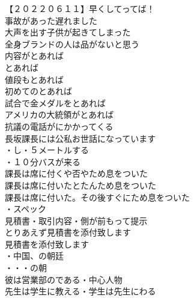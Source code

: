 \begin{multicols}{2}

【２０２２０６１１】早くしてってば！\\
事故があった遅れました\\
大声を出す子供が起きてしまった\\
全身ブランドの人は品がないと思う\\

内容がとあれば\\
とあれば\\
値段もとあれば\\
初めてのとあれば\\
試合で金メダルをとあれば\\
アメリカの大統領がとあれば\\

抗議の電話がにかかってくる\\
長坂課長には公私お世話になっています\\
・し・５メートルする\\
・１０分バスが来る\\

課長は席に付くや否やため息をついた\\
課長は席に付いたとたんため息をついた\\
課長は席に付いた。その後すぐにため息をついた\\

・スペック\\
見積書・取引内容・側が前もって提示\\
とりあえず見積書を添付致します\\
見積書を添付致します\\

・中国、の朝廷\\
・・・の朝\\
彼は営業部のである・中心人物\\
先生は学生に教える・学生は先生にわる\\


\end{multicols}
